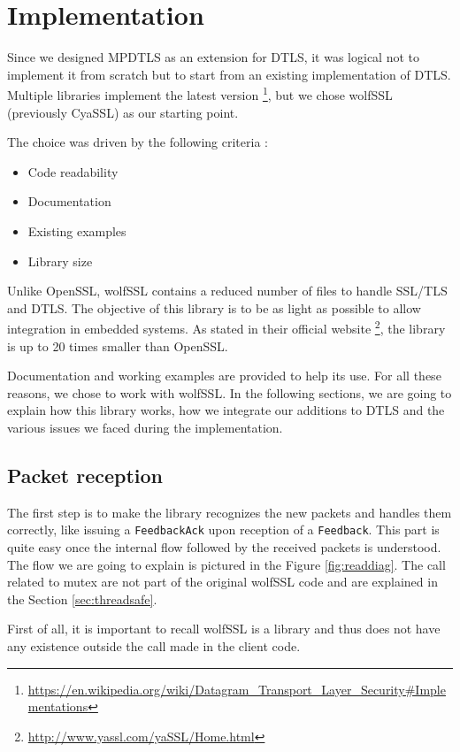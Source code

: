 \chapter{Implementation}\label{chap:implementation}

Since we designed MPDTLS as an extension for DTLS, it was logical not to implement it from scratch but to start from an existing implementation of DTLS. Multiple libraries implement the latest version \footnote{\url{https://en.wikipedia.org/wiki/Datagram_Transport_Layer_Security\#Implementations}}, but we chose wolfSSL \cite{wolfssl} (previously CyaSSL) as our starting point.

The choice was driven by the following criteria :

\begin{itemize}
\item Code readability
\item Documentation
\item Existing examples
\item Library size
\end{itemize}

Unlike OpenSSL, wolfSSL contains a reduced number of files to handle SSL/TLS and DTLS. The objective of this library is to be as light as possible to allow integration in embedded systems. As stated in their official website \footnote{\url{http://www.yassl.com/yaSSL/Home.html}}, the library is up to 20 times smaller than OpenSSL.

Documentation and working examples are provided to help its use. For all these reasons, we chose to work with wolfSSL. In the following sections, we are going to explain how this library works, how we integrate our additions to DTLS and the various issues we faced during the implementation.

\section{Packet reception}
The first step is to make the library recognizes the new packets and handles them correctly, like issuing a \texttt{FeedbackAck} upon reception of a \texttt{Feedback}. This part is quite easy once the internal flow followed by the received packets is understood. The flow we are going to explain is pictured in the Figure \ref{fig:readdiag}. The call related to mutex are not part of the original wolfSSL code and are explained in the Section \ref{sec:threadsafe}.

First of all, it is important to recall wolfSSL is a library and thus does not have any existence outside the call made in the client code.

